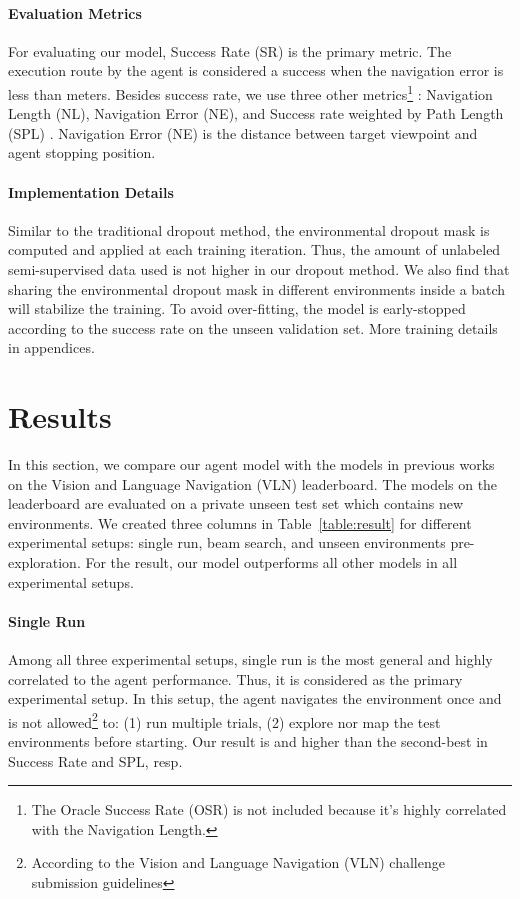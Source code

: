 \documentclass[11pt,a4paper]{article}
\begin{document}
\paragraph{Evaluation Metrics}
For evaluating our model, Success Rate (SR) is the primary metric. 
The execution route by the agent is considered a success when the navigation error is less than  meters. 
Besides success rate, we use three other metrics\footnote{
The Oracle Success Rate (OSR) is not included because it's highly correlated with the Navigation Length.
}
: Navigation Length (NL), Navigation Error (NE),  and Success rate weighted by Path Length (SPL) \cite{anderson2018evaluation}.
Navigation Error (NE) is the distance between target viewpoint  and agent stopping position.

\paragraph{Implementation Details}
\label{sec:train_detail}
Similar to the traditional dropout method, the environmental dropout mask is computed and applied at each training iteration.
Thus, the amount of unlabeled semi-supervised data used is not higher in our dropout method.
We also find that sharing the environmental dropout mask in different environments inside a batch will stabilize the training.
To avoid over-fitting, the model is early-stopped according to the success rate on the unseen validation set. More training details in appendices. \section{Results}
\label{sec:result}
In this section, we compare our agent model with the models in previous works on the Vision and Language Navigation (VLN) leaderboard.
The models on the leaderboard are evaluated on a private unseen test set which contains  new environments.
We created three columns in Table~\ref{table:result} for different experimental setups: single run, beam search, and unseen environments pre-exploration. 
For the result, our model outperforms all other models in all experimental setups.

\paragraph{Single Run}
Among all three experimental setups, single run is the most general and highly correlated to the agent performance. Thus, it is considered as the primary experimental setup.
In this setup, the agent navigates the environment once and is not allowed\footnote{According to the Vision and Language Navigation (VLN) challenge submission guidelines} to:
(1) run multiple trials,
(2) explore nor map the test environments before starting.
Our result is  and  higher than the second-best in Success Rate and SPL, resp. 
\end{document}
